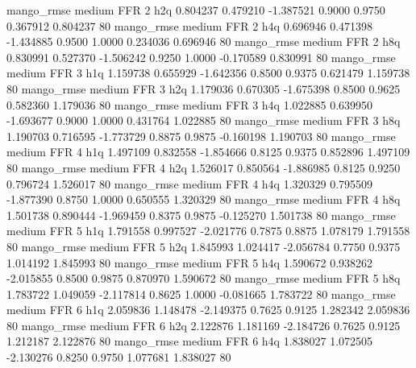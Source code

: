        mango_rmse     medium      FFR                 2                  h2q  0.804237 0.479210 -1.387521 0.9000 0.9750  0.367912    0.804237 80
       mango_rmse     medium      FFR                 2                  h4q  0.696946 0.471398 -1.434885 0.9500 1.0000  0.234036    0.696946 80
       mango_rmse     medium      FFR                 2                  h8q  0.830991 0.527370 -1.506242 0.9250 1.0000 -0.170589    0.830991 80
       mango_rmse     medium      FFR                 3                  h1q  1.159738 0.655929 -1.642356 0.8500 0.9375  0.621479    1.159738 80
       mango_rmse     medium      FFR                 3                  h2q  1.179036 0.670305 -1.675398 0.8500 0.9625  0.582360    1.179036 80
       mango_rmse     medium      FFR                 3                  h4q  1.022885 0.639950 -1.693677 0.9000 1.0000  0.431764    1.022885 80
       mango_rmse     medium      FFR                 3                  h8q  1.190703 0.716595 -1.773729 0.8875 0.9875 -0.160198    1.190703 80
       mango_rmse     medium      FFR                 4                  h1q  1.497109 0.832558 -1.854666 0.8125 0.9375  0.852896    1.497109 80
       mango_rmse     medium      FFR                 4                  h2q  1.526017 0.850564 -1.886985 0.8125 0.9250  0.796724    1.526017 80
       mango_rmse     medium      FFR                 4                  h4q  1.320329 0.795509 -1.877390 0.8750 1.0000  0.650555    1.320329 80
       mango_rmse     medium      FFR                 4                  h8q  1.501738 0.890444 -1.969459 0.8375 0.9875 -0.125270    1.501738 80
       mango_rmse     medium      FFR                 5                  h1q  1.791558 0.997527 -2.021776 0.7875 0.8875  1.078179    1.791558 80
       mango_rmse     medium      FFR                 5                  h2q  1.845993 1.024417 -2.056784 0.7750 0.9375  1.014192    1.845993 80
       mango_rmse     medium      FFR                 5                  h4q  1.590672 0.938262 -2.015855 0.8500 0.9875  0.870970    1.590672 80
       mango_rmse     medium      FFR                 5                  h8q  1.783722 1.049059 -2.117814 0.8625 1.0000 -0.081665    1.783722 80
       mango_rmse     medium      FFR                 6                  h1q  2.059836 1.148478 -2.149375 0.7625 0.9125  1.282342    2.059836 80
       mango_rmse     medium      FFR                 6                  h2q  2.122876 1.181169 -2.184726 0.7625 0.9125  1.212187    2.122876 80
       mango_rmse     medium      FFR                 6                  h4q  1.838027 1.072505 -2.130276 0.8250 0.9750  1.077681    1.838027 80
